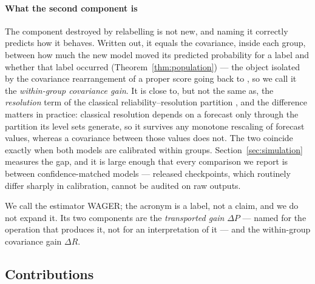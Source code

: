 \paragraph{What the second component is}
The component destroyed by relabelling is not new, and naming it correctly predicts how it
behaves. Written out, it equals the covariance, inside each group, between how much the new
model moved its predicted probability for a label and whether that label occurred
(Theorem~\ref{thm:population}) --- the object isolated by the covariance rearrangement of a
proper score going back to \citet{yates1982external}, so we call it the \emph{within-group
covariance gain}. It is close to, but not the same as, the \emph{resolution} term of the
classical reliability--resolution partition
\citep{murphy1973vector,degroot1983comparison,brocker2009reliability}, and the difference
matters in practice: classical resolution depends on a forecast only through the partition
its level sets generate, so it survives any monotone rescaling of forecast values, whereas a
covariance between those values does not. The two coincide exactly when both models are
calibrated within groups. Section~\ref{sec:simulation} measures the gap, and it is large
enough that every comparison we report is between confidence-matched models --- released
checkpoints, which routinely differ sharply in calibration, cannot be audited on raw outputs.

We call the estimator WAGER; the acronym is a label, not a claim, and we do not expand it.
Its two components are the \emph{transported gain} $\Delta P$ --- named for the operation
that produces it, not for an interpretation of it --- and the within-group covariance gain
$\Delta R$.

\subsection{Contributions}\label{sec:contributions}

